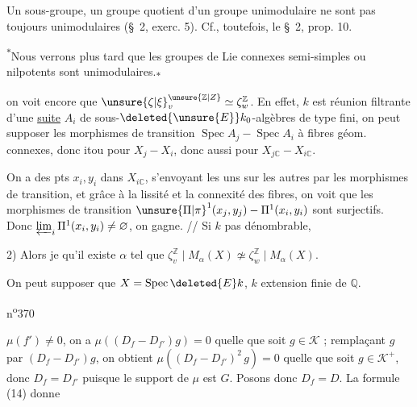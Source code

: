 Un sous-groupe, un groupe quotient d'un groupe unimodulaire ne sont pas toujours unimodulaires (\S\ 2, exerc. 5). Cf., toutefois, le \S\ 2, prop. 10.

\textsuperscript{$\ast$}Nous verrons plus tard que les groupes de Lie connexes semi-simples ou nilpotents sont unimodulaires.\textsubscript{$\ast$}

  on voit encore que $\unsure{\zeta|\xi}^{\unsure{\mathbb{Z}|Z}}_v\simeq\zeta_w^{\mathbb{Z}}$. En effet, $k$ est réunion filtrante d'une \uline{suite} $A_i$ de sous-$\deleted{\unsure{E}}k_0$-algèbres de type fini, on peut supposer les morphismes de transition $\operatorname{Spec} A_j\mathbin{-}\operatorname{Spec} A_i$  à fibres géom. connexes, donc itou pour $X_j\mathbin{-}X_i$, donc aussi pour $X_{j\mathbb{C}}\mathbin{-}X_{i\mathbb{C}}$.

On a des pts $x_i,y_i$ dans $X_{i\mathbb{C}}$, s'envoyant les uns sur les autres par les morphismes de transition, et grâce à la lissité et la connexité des fibres, on voit que les morphismes de transition $\unsure{\Pi|\pi}^{1}(x_j,y_j)\mathbin{-}\Pi^{1}(x_i,y_i)$ sont surjectifs. Donc $\varprojlim_i\Pi^{1}(x_i,y_i)\ne\varnothing$, on gagne. // Si $k$ pas dénombrable,

2)   Alors je   qu'il existe $\alpha$ tel que $\zeta^{\mathbb{Z}}_v\mid M_\alpha(X)\not\simeq\zeta^{\mathbb{Z}}_w\mid M_\alpha(X)$.


On peut supposer que $X=\operatorname{Spec}\deleted{E}k$, $k$ extension finie de $\mathbb{Q}$.


 \hfill n\textsuperscript{o}370

$\mu(f')\ne0$, on a $\mu((D_f-D_{f'})g)=0$ quelle que soit $g\in\mathcal{K}$ ; remplaçant $g$ par $(D_f-D_{f'})g$, on obtient $\mu((D_f-D_{f'})^2\,g)=0$ quelle que soit $g\in\mathcal{K}^+$, donc $D_f=D_{f'}$ puisque le support de $\mu$ est $G$. Posons donc $D_f=D$. La formule (14) donne

